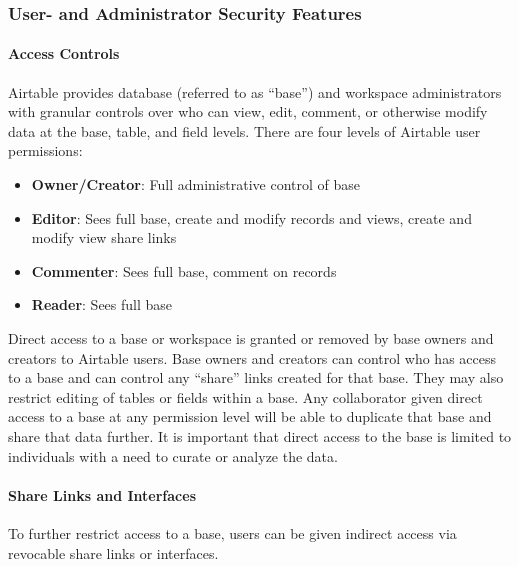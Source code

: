 \documentclass[
]{book}
\providecommand{\tightlist}{%
  \setlength{\itemsep}{0pt}\setlength{\parskip}{0pt}}
\begin{document}
\hypertarget{user--and-administrator-security-features}{%
\subsubsection{User- and Administrator Security Features}\label{user--and-administrator-security-features}}

\hypertarget{access-controls}{%
\paragraph{Access Controls}\label{access-controls}}

Airtable provides database (referred to as ``base'') and workspace administrators with granular controls over who can view, edit, comment, or otherwise modify data at the base, table, and field levels. There are four levels of Airtable user permissions:

\begin{itemize}
\tightlist
\item
  \textbf{Owner/Creator}: Full administrative control of base\\
\item
  \textbf{Editor}: Sees full base, create and modify records and views, create and modify view share links\\
\item
  \textbf{Commenter}: Sees full base, comment on records\\
\item
  \textbf{Reader}: Sees full base
\end{itemize}

Direct access to a base or workspace is granted or removed by base owners and creators to Airtable users. Base owners and creators can control who has access to a base and can control any ``share'' links created for that base. They may also restrict editing of tables or fields within a base. Any collaborator given direct access to a base at any permission level will be able to duplicate that base and share that data further. It is important that direct access to the base is limited to individuals with a need to curate or analyze the data.

\hypertarget{share-links-and-interfaces}{%
\paragraph{Share Links and Interfaces}\label{share-links-and-interfaces}}

To further restrict access to a base, users can be given indirect access via revocable share links or interfaces.
\end{document}
